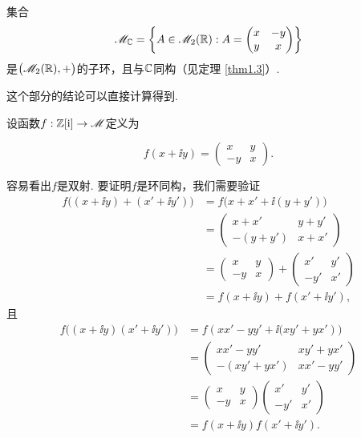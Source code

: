 \begin{solution}
  集合
  \[
    \MM_{\MC} = \left\{
      A\in\MM_2(\MR): A = \begin{pmatrix}
        x & -y \\
        y & x
      \end{pmatrix}
    \right\}
  \]
  是$\big(\mathscr M_2(\mathbb R),+\big)$的子环，且与$\mathbb C$同构（见定理 \ref{thm1.3}）.
\end{solution}

\begin{solution}
  \begin{enuma}
    \item 这个部分的结论可以直接计算得到.
    \item 设函数$f:\mathbb Z[\mathrm i]\to\mathscr M$定义为
  \end{enuma}
  \[
    f(x + \ii y ) = \begin{pmatrix}
      x & y \\
      -y & x
    \end{pmatrix}.
  \]

  容易看出$f$是双射. 要证明$f$是环同构，我们需要验证
  \begin{align*}
    f\big( (x + \ii y) + (x' + \ii y') \big ) & = f\big(  x + x' + \ii (y + y')\big) \\
    & = \begin{pmatrix}
      x + x' & y + y' \\
      - (y + y') & x + x'
    \end{pmatrix} \\
    & = \begin{pmatrix}
      x & y \\
      -y & x
    \end{pmatrix} + \begin{pmatrix}
      x' & y' \\
      -y' & x'
    \end{pmatrix} \\
    & = f(x + \ii y) + f(x' + \ii y'),
  \end{align*}
  且
  \begin{align*}
    f\big( (x + \ii y) (x' + \ii y') \big )
    & = f(xx' - yy' + \ii\big(xy' + yx')\big) \\
    & = \begin{pmatrix}
      xx' - yy' & xy' + yx' \\
      -(xy' + yx') & xx' - yy'
    \end{pmatrix} \\
    & = \begin{pmatrix}
      x & y \\
      -y & x
    \end{pmatrix}
    \begin{pmatrix}
      x' & y' \\
      -y' & x'
    \end{pmatrix} \\
    & = f(x + \ii y) f(x' + \ii y').
  \end{align*}
\end{solution}

